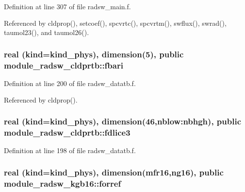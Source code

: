 Definition at line 307 of file radsw\+\_\+main.\+f.



Referenced by cldprop(), setcoef(), spcvrtc(), spcvrtm(), swflux(), swrad(), taumol23(), and taumol26().

\subsubsection[{\texorpdfstring{fbari}{fbari}}]{\setlength{\rightskip}{0pt plus 5cm}real (kind=kind\+\_\+phys), dimension(5), public module\+\_\+radsw\+\_\+cldprtb\+::fbari}\hypertarget{group__module__radsw__main_gac2e5b61aea6effe7d49586bf5223c154}{}\label{group__module__radsw__main_gac2e5b61aea6effe7d49586bf5223c154}


Definition at line 200 of file radsw\+\_\+datatb.\+f.



Referenced by cldprop().

\subsubsection[{\texorpdfstring{fdlice3}{fdlice3}}]{\setlength{\rightskip}{0pt plus 5cm}real (kind=kind\+\_\+phys), dimension(46,nblow\+:nbhgh), public module\+\_\+radsw\+\_\+cldprtb\+::fdlice3}\hypertarget{group__module__radsw__main_gaa42cf6596d2dcd887864b1de40da3293}{}\label{group__module__radsw__main_gaa42cf6596d2dcd887864b1de40da3293}


Definition at line 198 of file radsw\+\_\+datatb.\+f.

\subsubsection[{\texorpdfstring{forref}{forref}}]{\setlength{\rightskip}{0pt plus 5cm}real (kind=kind\+\_\+phys), dimension(mfr16,ng16), public module\+\_\+radsw\+\_\+kgb16\+::forref}\hypertarget{group__module__radsw__main_ga8e8cf110f56c7d4253c63bbf607be34c}{}\label{group__module__radsw__main_ga8e8cf110f56c7d4253c63bbf607be34c}


